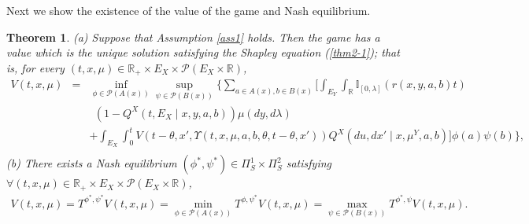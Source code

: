 \documentclass[12pt]{article}
\newtheorem{theorem}{Theorem}
\begin{document}
Next we  show the existence of the value of the game and Nash equilibrium.
\begin{theorem}\label{thm2}
(a) Suppose that Assumption \ref{ass1} holds.
Then the game has a value which is the unique solution satisfying the Shapley equation (\ref{thm2-1}); that is, for every $(t,x,\mu)\in \mathbb{R}_+\times E_X\times \mathscr{P}(E_X\times \mathbb{R})$,
\begin{eqnarray}\label{thm2-1}
V(t,x,\mu)&=&\inf_{\phi\in\mathscr{P}(A(x))}\sup_{\psi\in\mathscr{P}(B(x))}
\bigg\{\sum_{a\in A(x),b\in B(x)}\bigg[\int_{E_Y}\int_{\mathbb{R}}
\mathbb{I}_{[0,\lambda]}(r(x,y,a,b)t)\nonumber\\
&&~~(1-Q^X(t,E_X\mid x,y,a,b))\mu(dy,d\lambda)\nonumber\\
&&+\int_{E_X}\int_0^t V(t-\theta,x',\Upsilon(t,x,\mu,a,b,\theta,t-\theta,x'))
Q^X(du,dx'\mid x,\mu^Y,a,b)\bigg]\phi(a)\psi(b)\bigg\},\nonumber\\
\end{eqnarray}
(b) There exists a Nash equilibrium $(\phi^*,\psi^*)\in \Pi_S^1\times \Pi_S^2$ satisfying $\forall (t,x,\mu)\in \mathbb{R}_+\times E_X\times \mathscr{P}(E_X\times \mathbb{R})$,
\begin{eqnarray*}
V(t,x,\mu)=T^{\phi^*,\psi^*}V(t,x,\mu)
=\min_{\phi\in\mathscr{P}(A(x))}T^{\phi,\psi^*}V(t,x,\mu)
=\max_{\psi\in\mathscr{P}(B(x))}T^{\phi^*,\psi}V(t,x,\mu).
\end{eqnarray*}
\end{theorem}
\end{document}
